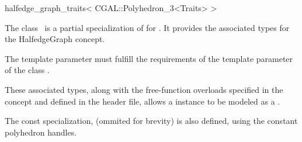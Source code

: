 

\begin{ccRefClass}{halfedge_graph_traits< CGAL::Polyhedron_3<Traits> >}


\ccDefinition

The class \ccRefName\ is a partial specialization of 
for . It provides the associated types 
for the {HalfedgeGraph} concept.

The template parameter  must fulfill the requirements of the template parameter 
 of the class .


These associated types, along with the free-function overloads specified in the concept and defined in the header file, allows a  instance to be modeled as a .

\ccTypes

The const specialization,  
(ommited for brevity) is also defined, using the constant polyhedron handles.

\ccSeeAlso

\end{ccRefClass}


